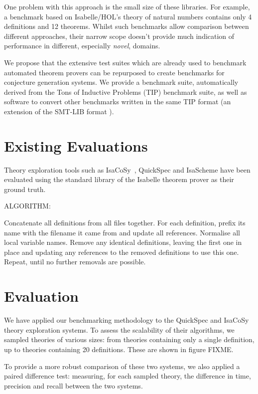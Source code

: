 One problem with this approach is the small size of these libraries. For
example, a benchmark based on Isabelle/HOL's theory of natural numbers contains
only 4 definitions and 12 theorems. Whilst such benchmarks allow
comparison between different approaches, their narrow scope doesn't provide much
indication of performance in different, especially \emph{novel}, domains.

We propose that the extensive test suites which are already used to benchmark
automated theorem provers can be repurposed to create benchmarks for conjecture
generation systems. We provide a benchmark suite, automatically derived from the
Tons of Inductive Problems (TIP) benchmark suite, as well as software to convert
other benchmarks written in the same TIP format (an extension of the SMT-LIB
format \cite{BarFT-SMTLIB}).

\section{Existing Evaluations}
\label{sec:previous}

Theory exploration tools such as
IsaCoSy~\cite{Johansson.Dixon.Bundy:conjecture-generation}, QuickSpec and
IsaScheme have been evaluated using the standard library of the Isabelle theorem
prover as their ground truth.

ALGORITHM:

Concatenate all definitions from all files together.
For each definition, prefix its name with the filename it came from and update
all references.
Normalise all local variable names.
Remove any identical definitions, leaving the first one in place and updating
any references to the removed definitions to use this one.
Repeat, until no further removals are possible.

\section{Evaluation}
\label{sec:evaluation}

We have applied our benchmarking methodology to the QuickSpec and IsaCoSy theory
exploration systems. To assess the scalability of their algorithms, we sampled
theories of various sizes: from theories containing only a single definition, up
to theories containing 20 definitions. These are shown in figure FIXME.

To provide a more robust comparison of these two systems, we also applied a
paired difference test: measuring, for each sampled theory, the difference in
time, precision and recall between the two systems.

